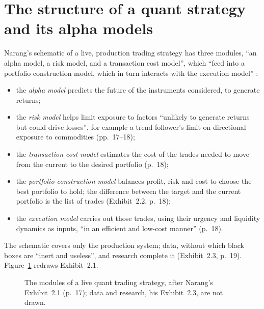 \section{The structure of a quant strategy and its alpha models}

\begin{qfdefinition}\label{def:quant-strategy-components}
 Narang's schematic of a live, production trading strategy has three modules, ``an alpha model, a risk model, and a transaction cost model'', which ``feed into a portfolio construction model, which in turn interacts with the execution model'' \citep[chap.~2, ``An Introduction to Quantitative Trading'', sec.~2.2, Exhibit~2.1, p.~17]{s7-narang}:
\begin{itemize}
\item the \emph{alpha model} predicts the future of the instruments considered, to generate returns;
\item the \emph{risk model} helps limit exposure to factors ``unlikely to generate returns but could drive losses'', for example a trend follower's limit on directional exposure to commodities (pp.~17--18);
\item the \emph{transaction cost model} estimates the cost of the trades needed to move from the current to the desired portfolio (p.~18);
\item the \emph{portfolio construction model} balances profit, risk and cost to choose the best portfolio to hold; the difference between the target and the current portfolio is the list of trades (Exhibit~2.2, p.~18);
\item the \emph{execution model} carries out those trades, using their urgency and liquidity dynamics as inputs, ``in an efficient and low-cost manner'' (p.~18).
\end{itemize}
The schematic covers only the production system; data, without which black boxes are ``inert and useless'', and research complete it (Exhibit~2.3, p.~19). Figure~\ref{fig:quant-strategy-structure} redraws Exhibit~2.1.
\begin{figure}[ht]
\centering

\caption{The modules of a live quant trading strategy, after Narang's Exhibit~2.1 (p.~17); data and research, his Exhibit~2.3, are not drawn.}\label{fig:quant-strategy-structure}
\end{figure}


\end{qfdefinition}
